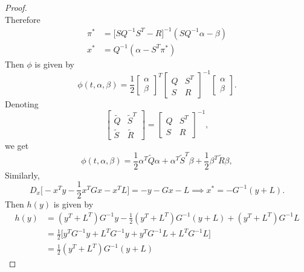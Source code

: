 \begin{proof}
\begin{equation*}
\end{equation*}
Therefore
\begin{align*}
    \pi^\ast &= \big[ S Q^{-1}S^T - R \big]^{-1}(S Q^{-1} \alpha - \beta)\\
    x^\ast &= Q^{-1} (\alpha - S^T \pi^\ast)
\end{align*}
Then $\phi$ is given by
\begin{equation*}
    \phi(t, \alpha, \beta) = 
    \frac12
    \begin{bmatrix}
        \alpha\\
        \beta
    \end{bmatrix}^T
    \begin{bmatrix}
        Q & S^T\\
        S & R
    \end{bmatrix}^{-1}
    \begin{bmatrix}
        \alpha\\
        \beta
    \end{bmatrix}.
\end{equation*}
Denoting
\begin{equation*}\begin{bmatrix}
        \tilde{Q} & \tilde{S}^T\\
        \tilde{S} & \tilde{R}
    \end{bmatrix}
    =
    \begin{bmatrix}
        Q & S^T\\
        S & R
    \end{bmatrix}^{-1},
\end{equation*}
we get
\begin{equation*}
    \phi(t, \alpha, \beta) = \frac12 \alpha^T \tilde{Q} \alpha + \alpha^T \tilde{S}^T \beta + \frac12 \beta^T \tilde{R} \beta,
\end{equation*}
Similarly, 
\begin{equation*}
    D_x \big[-x^T y - \frac12 x^T G x - x^T L \big] = -y - Gx - L \implies x^\ast = - G^{-1} (y + L).
\end{equation*}
Then $h(y)$ is given by
\begin{align*}
    h(y) &= (y^T + L^T) G^{-1} y - \frac12 (y^T + L^T)G^{-1}(y + L) + (y^T + L^T) G^{-1} L\\
    &= \frac12 \big[ y^T G^{-1} y +  L^T G^{-1} y + y^T G^{-1} L + L^T G^{-1} L\big]\\
    &= \frac12 (y^T + L^T)G^{-1}(y + L)
\end{align*}

\end{proof}